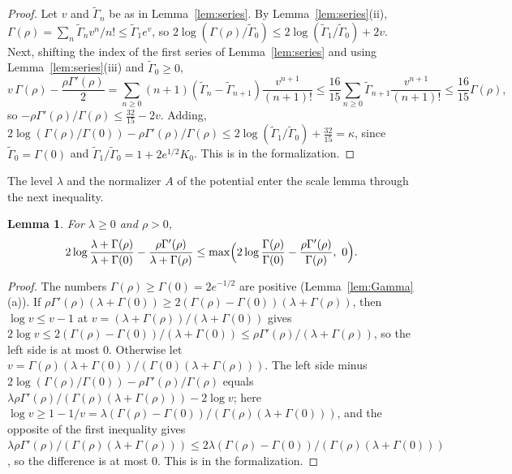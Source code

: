 \documentclass[12pt]{amsart}
\newtheorem{lemma}[theorem]{Lemma}
\theoremstyle{definition}
\numberwithin{equation}{section}
\newcommand{\leanmap}[1]{\ignorespaces}
\newcommand{\mapnote}[1]{\ignorespaces}
\begin{document}
\begin{proof}
Let $v$ and $\tilde\Gamma_n$ be as in Lemma~\ref{lem:series}. By Lemma~\ref{lem:series}(ii), $\Gamma(\rho)=\sum_n\tilde\Gamma_nv^n/n!\le\tilde\Gamma_1e^v$, so $2\log(\Gamma(\rho)/\tilde\Gamma_0)\le2\log(\tilde\Gamma_1/\tilde\Gamma_0)+2v$. Next, shifting the index of the first series of Lemma~\ref{lem:series} and using Lemma~\ref{lem:series}(iii) and $\tilde\Gamma_0\ge0$,
\[
v\,\Gamma(\rho)-\frac{\rho\Gamma'(\rho)}2=\sum_{n\ge0}(n+1)(\tilde\Gamma_n-\tilde\Gamma_{n+1})\frac{v^{n+1}}{(n+1)!}\le\frac{16}{15}\sum_{n\ge0}\tilde\Gamma_{n+1}\frac{v^{n+1}}{(n+1)!}\le\frac{16}{15}\Gamma(\rho),
\]
so $-\rho\Gamma'(\rho)/\Gamma(\rho)\le\frac{32}{15}-2v$. Adding, $2\log(\Gamma(\rho)/\Gamma(0))-\rho\Gamma'(\rho)/\Gamma(\rho)\le2\log(\tilde\Gamma_1/\tilde\Gamma_0)+\frac{32}{15}=\kappa$, since $\tilde\Gamma_0=\Gamma(0)$ and $\tilde\Gamma_1/\tilde\Gamma_0=1+2e^{1/2}K_0$. This is  in the formalization.
\end{proof}

The level $\lambda$ and the normalizer $A$ of the potential enter the scale lemma through the next inequality.

\begin{lemma}\label{lem:lamred}
\leanmap{RegretKappa.UnknownBT.UB.lam_reduction}
\mapnote{Lean proves it for two positive numbers in place of $\Gamma(\rho)$ and $\Gamma(0)$ and every real number in place of $\rho\Gamma'(\rho)$.}
For $\lambda\ge0$ and $\rho>0$,
\[
2\log\frac{\lambda+\Gamma(\rho)}{\lambda+\Gamma(0)}-\frac{\rho\Gamma'(\rho)}{\lambda+\Gamma(\rho)}\le\max\Bigl(2\log\frac{\Gamma(\rho)}{\Gamma(0)}-\frac{\rho\Gamma'(\rho)}{\Gamma(\rho)},\ 0\Bigr).
\]
\end{lemma}

\begin{proof}
The numbers $\Gamma(\rho)\ge\Gamma(0)=2e^{-1/2}$ are positive (Lemma~\ref{lem:Gamma}(a)). If $\rho\Gamma'(\rho)(\lambda+\Gamma(0))\ge2(\Gamma(\rho)-\Gamma(0))(\lambda+\Gamma(\rho))$, then $\log v\le v-1$ at $v=(\lambda+\Gamma(\rho))/(\lambda+\Gamma(0))$ gives $2\log v\le2(\Gamma(\rho)-\Gamma(0))/(\lambda+\Gamma(0))\le\rho\Gamma'(\rho)/(\lambda+\Gamma(\rho))$, so the left side is at most $0$. Otherwise let $v=\Gamma(\rho)(\lambda+\Gamma(0))/(\Gamma(0)(\lambda+\Gamma(\rho)))$. The left side minus $2\log(\Gamma(\rho)/\Gamma(0))-\rho\Gamma'(\rho)/\Gamma(\rho)$ equals $\lambda\rho\Gamma'(\rho)/(\Gamma(\rho)(\lambda+\Gamma(\rho)))-2\log v$; here $\log v\ge1-1/v=\lambda(\Gamma(\rho)-\Gamma(0))/(\Gamma(\rho)(\lambda+\Gamma(0)))$, and the opposite of the first inequality gives $\lambda\rho\Gamma'(\rho)/(\Gamma(\rho)(\lambda+\Gamma(\rho)))\le2\lambda(\Gamma(\rho)-\Gamma(0))/(\Gamma(\rho)(\lambda+\Gamma(0)))$, so the difference is at most $0$. This is  in the formalization.
\end{proof}
\end{document}
